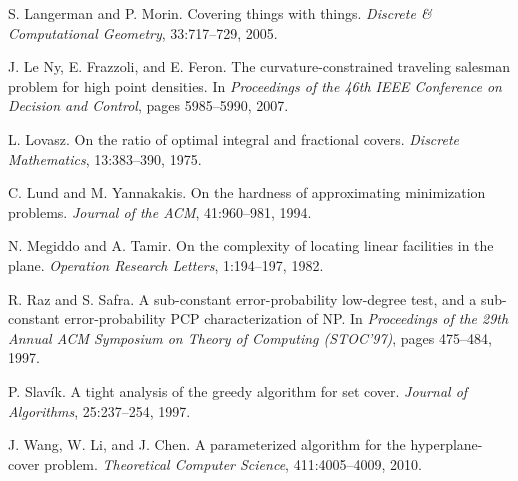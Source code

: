 \documentclass[letterpaper,11pt]{article}
\begin{document}
\begin{thebibliography}{99}
S. Langerman and P. Morin.
Covering things with things.
\emph{Discrete \& Computational Geometry},
33:717--729, 2005.

J. Le Ny, E. Frazzoli, and E. Feron.
The curvature-constrained traveling salesman problem for high point densities.
In \emph{Proceedings of the 46th IEEE Conference on Decision and Control},
pages 5985--5990, 2007.

L. Lovasz.
On the ratio of optimal integral and fractional covers.
\emph{Discrete Mathematics},
13:383--390, 1975.

C. Lund and M. Yannakakis.
On the hardness of approximating minimization problems.
\emph{Journal of the ACM},
41:960--981, 1994.

N. Megiddo and A. Tamir.
On the complexity of locating linear facilities in the plane.
\emph{Operation Research Letters},
1:194--197, 1982.

R. Raz and S. Safra.
A sub-constant error-probability low-degree test, and a sub-constant
error-probability PCP characterization of NP. In
\emph{Proceedings of the 29th Annual ACM Symposium on Theory of Computing (STOC'97)},
pages 475--484, 1997.

P. Slav\'ik.
A tight analysis of the greedy algorithm for set cover.
\emph{Journal of Algorithms},
25:237--254, 1997.

J. Wang, W. Li, and J. Chen.
A parameterized algorithm for the hyperplane-cover problem.
\emph{Theoretical Computer Science},
411:4005--4009, 2010.

\end{thebibliography}
\end{document}
